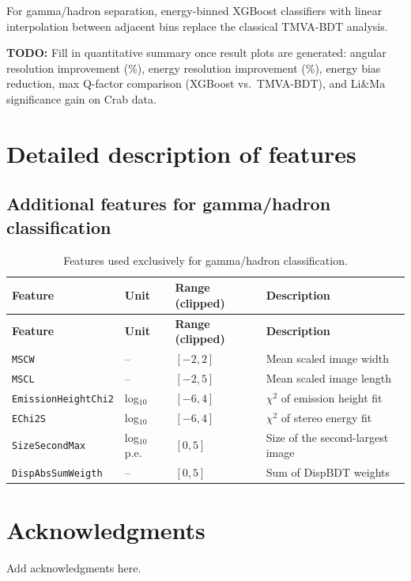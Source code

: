 \documentclass[12pt]{article}
\newcommand{\todo}[1]{\begin{hintBox} \textbf{TODO:} #1 \end{hintBox}}
\begin{document}
For gamma/hadron separation, energy-binned XGBoost classifiers with linear
interpolation between adjacent bins replace the classical TMVA-BDT analysis.

\todo{Fill in quantitative summary once result plots are generated: angular resolution improvement (\%), energy resolution improvement (\%), energy bias reduction, max Q-factor comparison (XGBoost vs.\ TMVA-BDT), and Li\&Ma significance gain on Crab data.}

\section{Detailed description of features}
\label{sec:appendix_features}

\subsection{Additional features for gamma/hadron classification}

\begin{longtable}{lll p{5.5cm}}
\caption{Features used exclusively for gamma/hadron classification.} \label{tab:features-class} \\
\hline
\textbf{Feature} & \textbf{Unit} & \textbf{Range (clipped)} & \textbf{Description} \\
\hline
\endfirsthead
\hline
\textbf{Feature} & \textbf{Unit} & \textbf{Range (clipped)} & \textbf{Description} \\
\hline
\endhead
\hline
\endfoot
\texttt{MSCW} & -- & $[-2,2]$ & Mean scaled image width \\
\texttt{MSCL} & -- & $[-2,5]$ & Mean scaled image length \\
\texttt{EmissionHeightChi2} & log$_{10}$ & $[-6,4]$ & $\chi^2$ of emission height fit \\
\texttt{EChi2S} & log$_{10}$ & $[-6,4]$ & $\chi^2$ of stereo energy fit \\
\texttt{SizeSecondMax} & log$_{10}$ p.e. & $[0,5]$ & Size of the second-largest image \\
\texttt{DispAbsSumWeigth} & -- & $[0,5]$ & Sum of DispBDT weights \\
\end{longtable}


\section*{Acknowledgments}

Add acknowledgments here.



\end{document}
